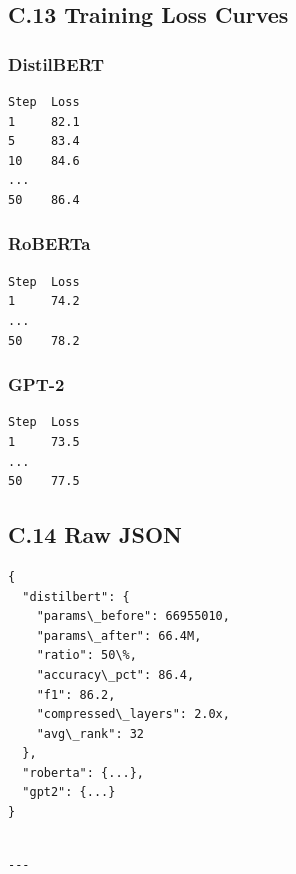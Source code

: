 \subsection{C.13 Training Loss Curves}

\subsubsection{DistilBERT}
\begin{lstlisting}
Step  Loss
1     82.1
5     83.4
10    84.6
...
50    86.4
\end{lstlisting}

\subsubsection{RoBERTa}
\begin{lstlisting}
Step  Loss
1     74.2
...
50    78.2
\end{lstlisting}

\subsubsection{GPT-2}
\begin{lstlisting}
Step  Loss
1     73.5
...
50    77.5
\end{lstlisting}

\subsection{C.14 Raw JSON}

\begin{lstlisting}
{
  "distilbert": {
    "params\_before": 66955010,
    "params\_after": 66.4M,
    "ratio": 50\%,
    "accuracy\_pct": 86.4,
    "f1": 86.2,
    "compressed\_layers": 2.0x,
    "avg\_rank": 32
  },
  "roberta": {...},
  "gpt2": {...}
}
\end{lstlisting}
\begin{lstlisting}

---
\end{lstlisting}